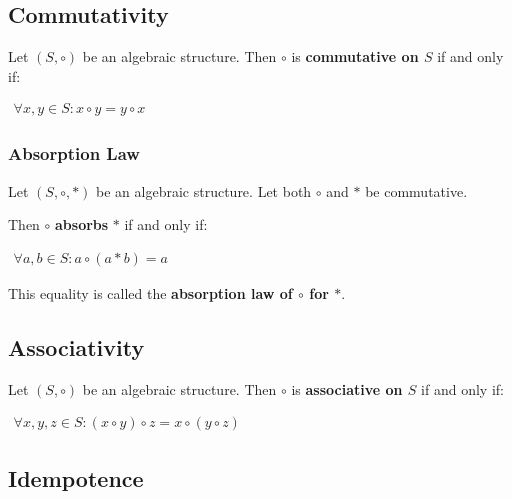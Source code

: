 \subsection{Commutativity}
\label{sec:commutativity}

Let $(S, \circ)$ be an algebraic structure. Then $\circ$ is
\textbf{commutative on $S$} if and only if:

\begin{math}
  \begin{array}{c}
    \forall x, y \in S: x \circ y = y \circ x
  \end{array}
\end{math}

\subsubsection{Absorption Law}
\label{sec:absorption}

Let $(S, \circ, *)$ be an algebraic structure. Let both $\circ$ and
$*$ be commutative.

Then $\circ$ \textbf{absorbs} $*$ if and only if:

\begin{math}
  \begin{array}{c}
    \forall a, b \in S: a \circ (a * b) = a
  \end{array}
\end{math}

This equality is called the \textbf{absorption law of $\circ$ for
  $*$}.



\subsection{Associativity}
\label{sec:associativity}

Let $(S, \circ)$ be an algebraic structure. Then $\circ$ is
\textbf{associative on $S$} if and only if:

\begin{math}
  \begin{array}{c}
    \forall x, y, z \in S: (x \circ y) \circ z = x \circ (y \circ z)
  \end{array}
\end{math}


\subsection{Idempotence}
\label{sec:idempotence}

